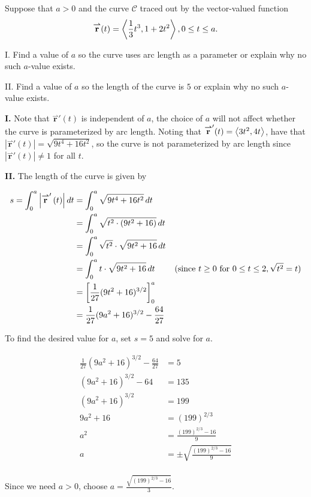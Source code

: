 \documentclass[noauthor,handout]{ximera}
\newcommand{\Magd}[2]{\left| \vec{#1}'\left(#2\right) \right|}
\renewcommand{\vec}[1]{{\overset{\boldsymbol{\rightharpoonup}}{\mathbf{#1}}}}
\begin{document}
\begin{problem}
Suppose that $a>0$ and the curve $\mathcal{C}$ traced out by the vector-valued function \[ \vec{r}(t) = \vector{\frac{1}{3}t^3, 1+2t^2}, 0 \leq t \leq a. \]

I. Find a value of $a$ so the curve uses arc length as a parameter or explain why no such $a$-value exists.

II. Find a value of $a$ so the length of the curve is $5$ or explain why no such $a$-value exists.

\begin{freeResponse} 
\textbf{I.} Note that $\vec{r}'(t)$ is independent of $a$, the choice of $a$ will not affect whether the curve is parameterized by arc length.  Noting that  $\vec{r}'(t) = \vector{3t^2, 4t}$, have that $\Magd{r}{t} = \sqrt{9t^4+16t^2}$, so the curve is not parameterized by arc length since $\Magd{r}{t} \neq 1 $ for all $t$.

\textbf{II.}
The length of the curve is given by 

\begin{align*}
s = \int_0^a \Magd{r}{t} \d t  &= \int_0^a \sqrt{9t^4+16t^2} \d t \\
&= \int_0^a \sqrt{t^2 \cdot \left(9t^2+16\right)} \d t \\
&=  \int_0^a \sqrt{t^2} \cdot \sqrt{9t^2+16} \d t \\
&=  \int_0^a t \cdot \sqrt{9t^2+16} \d t \qquad \textrm{ (since } t \geq 0 \textrm{ for } 0 \leq t \leq 2, \sqrt{t^2} = t)\\
&=\eval{\frac{1}{27}(9t^2+16)^{3/2} }_0^a \\
&=\frac{1}{27}(9a^2+16)^{3/2}-\frac{64}{27}
\end{align*}

To find the desired value for $a$, set $s=5$ and solve for $a$.

\begin{align*}
\frac{1}{27}(9a^2+16)^{3/2}-\frac{64}{27}&=5 \\
(9a^2+16)^{3/2}-64&=135 \\
(9a^2+16)^{3/2}&=199 \\
9a^2+16&=(199)^{2/3} \\
a^2&=\frac{(199)^{2/3}-16}{9} \\
a&=\pm\sqrt{\frac{(199)^{2/3}-16}{9}} \\
\end{align*}

Since we need $a>0$, choose $a=\frac{\sqrt{(199)^{2/3}-16}}{3}$.
\end{freeResponse}
\end{problem}

\end{document}

